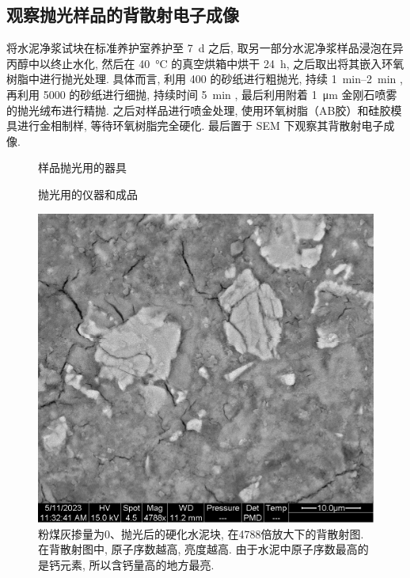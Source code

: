 \subsection{观察抛光样品的背散射电子成像}

将水泥净浆试块在标准养护室养护至 \SI{7}{\day} 之后, 取另一部分水泥净浆样品浸泡在异丙醇中以终止水化, 然后在 \SI{40}{\degreeCelsius} 的真空烘箱中烘干 \SI{24}{\hour}, 之后取出将其嵌入环氧树脂中进行抛光处理. 具体而言, 利用 \SI{400}{} 的砂纸进行粗抛光, 持续 \qtyrange{1}{2}{\minute} , 再利用 \SI{5000}{} 的砂纸进行细抛, 持续时间 \SI{5}{\minute} , 最后利用附着 \SI{1}{\micro\meter} 金刚石喷雾的抛光绒布进行精抛. 
之后对样品进行喷金处理, 使用环氧树脂（AB胶）和硅胶模具进行金相制样, 等待环氧树脂完全硬化. 
最后置于 SEM 下观察其背散射电子成像.


\begin{figure}[!t]
    \centering
     \quad
     \quad
    \caption{样品抛光用的器具}
\end{figure}

\begin{figure}[!t]
    \centering
     \quad
    \caption{抛光用的仪器和成品}
\end{figure}


\begin{figure}
    \centering
    \includegraphics[width = 0.4 \linewidth]{assets/00-polished-04788x-PMD.png}
    \caption{粉煤灰掺量为\num{0}、抛光后的硬化水泥块, 在\num{4788}倍放大下的背散射图.在背散射图中, 原子序数越高, 亮度越高. 由于水泥中原子序数最高的是钙元素, 所以含钙量高的地方最亮. }
\end{figure}


